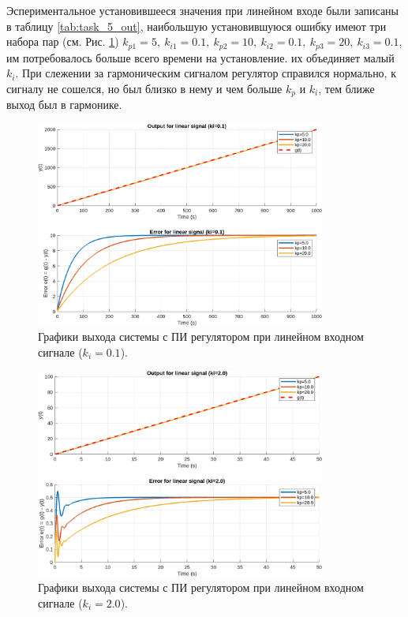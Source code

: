 Эспериментальное установившееся значения при линейном входе были записаны в таблицу \ref{tab:task_5_out}, наибольшую установившуюся ошибку
имеют три набора пар (см. Рис. \ref{fig:task_5_out_linear_ki0.1}) $k_{p1}=5,\ k_{i1}=0.1,\ k_{p2}=10,\ k_{i2}=0.1,\ k_{p3}=20,\ k_{i3}=0.1$,
им потребовалось больше всего времени на установление.
их объединяет малый $k_i$. При слежении за гармоническим сигналом регулятор справился нормально, 
к сигналу не сошелся, но был близко в нему и чем больше $k_p$ и $k_i$, тем ближе выход был в гармонике.

\begin{figure}[H]
    \centering
    \includegraphics[width=0.85\textwidth]{figs/task_5_out_linear_ki0.1.png}
    \caption{Графики выхода системы с ПИ регулятором при линейном входном сигнале (\( k_i = 0.1 \)).}
    \label{fig:task_5_out_linear_ki0.1}
\end{figure}

\begin{figure}[H]
    \centering
    \includegraphics[width=0.85\textwidth]{figs/task_5_out_linear_ki2.0.png}
    \caption{Графики выхода системы с ПИ регулятором при линейном входном сигнале (\( k_i = 2.0 \)).}
    \label{fig:task_5_out_linear_ki2.0}
\end{figure}

